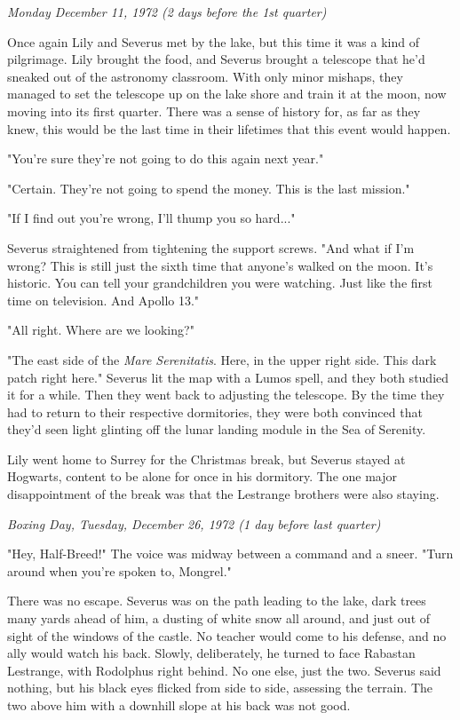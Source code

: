 \documentclass[a4paper,11pt]{article}
\begin{document}
\emph{Monday December 11, 1972 (2 days before the 1st quarter)}

Once again Lily and Severus met by the lake, but this time it was a kind of pilgrimage. Lily brought the food, and Severus brought a telescope that he'd sneaked out of the astronomy classroom. With only minor mishaps, they managed to set the telescope up on the lake shore and train it at the moon, now moving into its first quarter. There was a sense of history for, as far as they knew, this would be the last time in their lifetimes that this event would happen.

"You're sure they're not going to do this again next year."

"Certain. They're not going to spend the money. This is the last mission."

"If I find out you're wrong, I'll thump you so hard..."

Severus straightened from tightening the support screws. "And what if I'm wrong? This is still just the sixth time that anyone's walked on the moon. It's historic. You can tell your grandchildren you were watching. Just like the first time on television. And Apollo 13."

"All right. Where are we looking?"

"The east side of the \emph{Mare Serenitatis}. Here, in the upper right side. This dark patch right here." Severus lit the map with a Lumos spell, and they both studied it for a while. Then they went back to adjusting the telescope. By the time they had to return to their respective dormitories, they were both convinced that they'd seen light glinting off the lunar landing module in the Sea of Serenity.

Lily went home to Surrey for the Christmas break, but Severus stayed at Hogwarts, content to be alone for once in his dormitory. The one major disappointment of the break was that the Lestrange brothers were also staying.

\emph{Boxing Day, Tuesday, December 26, 1972 (1 day before last quarter)}

"Hey, Half-Breed!" The voice was midway between a command and a sneer. "Turn around when you're spoken to, Mongrel."

There was no escape. Severus was on the path leading to the lake, dark trees many yards ahead of him, a dusting of white snow all around, and just out of sight of the windows of the castle. No teacher would come to his defense, and no ally would watch his back. Slowly, deliberately, he turned to face Rabastan Lestrange, with Rodolphus right behind. No one else, just the two. Severus said nothing, but his black eyes flicked from side to side, assessing the terrain. The two above him with a downhill slope at his back was not good.
\end{document}
